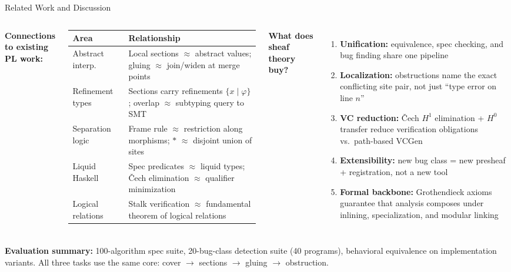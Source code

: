 \documentclass[aspectratio=169,11pt]{beamer}
\begin{document}
\begin{frame}{Related Work and Discussion}

\begin{columns}[T]

\textbf{Connections to existing PL work:}

\vspace{0.3em}
{\small
\begin{tabular}{@{}lp{4cm}@{}}
\textbf{Area} & \textbf{Relationship} \\
\hline
Abstract interp. & Local sections $\approx$ abstract values;
  gluing $\approx$ join/widen at merge points \\[3pt]
Refinement types & Sections carry refinements $\{x \mid \varphi\}$;
  overlap $\approx$ subtyping query to SMT \\[3pt]
Separation logic & Frame rule $\approx$ restriction along morphisms;
  $*$ $\approx$ disjoint union of sites \\[3pt]
Liquid Haskell & Spec predicates $\approx$ liquid types;
  \v{C}ech elimination $\approx$ qualifier minimization \\[3pt]
Logical relations & Stalk verification $\approx$ fundamental theorem of logical relations \\
\end{tabular}
}


\textbf{What does sheaf theory buy?}

\vspace{0.3em}
\begin{enumerate}
  \item \textbf{Unification:} equivalence, spec checking, and bug finding share one pipeline
  \item \textbf{Localization:} obstructions name the exact conflicting site pair, not just ``type error on line $n$''
  \item \textbf{VC reduction:} \v{C}ech $H^1$ elimination + $H^0$ transfer reduce verification obligations vs.\ path-based VCGen
  \item \textbf{Extensibility:} new bug class = new presheaf + registration, not a new tool
  \item \textbf{Formal backbone:} Grothendieck axioms guarantee that analysis composes under inlining, specialization, and modular linking
\end{enumerate}

\end{columns}

\vspace{0.4em}
{\small \textbf{Evaluation summary:} 100-algorithm spec suite, 20-bug-class detection suite (40 programs),
behavioral equivalence on implementation variants.
All three tasks use the same core: cover $\to$ sections $\to$ gluing $\to$ obstruction.}

\end{frame}
\end{document}

